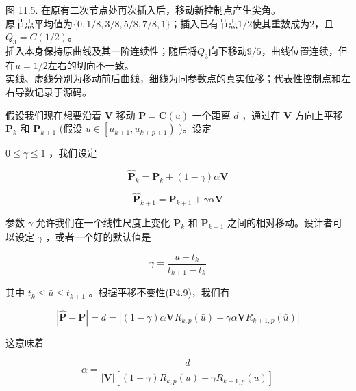 \documentclass[../main.tex]{subfiles}
\begin{document}
\begin{center}
\begin{minipage}{26cm}
\vspace*{.6\baselineskip}
\centering
{}
\par\smallskip
图 11.5. 在原有二次节点处再次插入后，移动新控制点产生尖角。\\
原节点平均值为$\{0,1/8,3/8,5/8,7/8,1\}$；插入已有节点$1/2$使其重数成为2，且$Q_3=C(1/2)$。\\
插入本身保持原曲线及其一阶连续性；随后将$Q_3$向下移动$9/5$，曲线位置连续，但在$u=1/2$左右的切向不一致。\\
实线、虚线分别为移动前后曲线，细线为同参数点的真实位移；代表性控制点和左右导数记录于源码。
\end{minipage}
\end{center}

假设我们现在想要沿着 \(\mathbf{V}\) 移动 \(\mathbf{P} = \mathbf{C}\left( \bar{u}\right)\) 一个距离 \(d\) ，通过在 \(\mathbf{V}\) 方向上平移 \({\mathbf{P}}_{k}\) 和 \({\mathbf{P}}_{k + 1}\) (假设 \(\bar{u} \in  \left\lbrack  {{u}_{k + 1},{u}_{k + p + 1}}\right)\) )。设定





\(0 \leq  \gamma  \leq  1\) ，我们设定

\[
{\widehat{\mathbf{P}}}_{k} = {\mathbf{P}}_{k} + \left( {1 - \gamma }\right) \alpha \mathbf{V}
\]

\[
{\widehat{\mathbf{P}}}_{k + 1} = {\mathbf{P}}_{k + 1} + {\gamma \alpha }\mathbf{V} \tag{11.7}
\]

参数 \(\gamma\) 允许我们在一个线性尺度上变化 \({\mathbf{P}}_{k}\) 和 \({\mathbf{P}}_{k + 1}\) 之间的相对移动。设计者可以设定 \(\gamma\) ，或者一个好的默认值是

\[
\gamma  = \frac{\bar{u} - {t}_{k}}{{t}_{k + 1} - {t}_{k}} \tag{11.8}
\]

其中 \({t}_{k} \leq  \bar{u} \leq  {t}_{k + 1}\) 。根据平移不变性(P4.9)，我们有

\[
\left| {\widehat{\mathbf{P}} - \mathbf{P}}\right|  = d = \left| {\left( {1 - \gamma }\right) \alpha \mathbf{V}{R}_{k,p}\left( \bar{u}\right)  + {\gamma \alpha }\mathbf{V}{R}_{k + 1,p}\left( \bar{u}\right) }\right|
\]

这意味着

\[
\alpha  = \frac{d}{\left| \mathbf{V}\right| \left\lbrack  {\left( {1 - \gamma }\right) {R}_{k,p}\left( \bar{u}\right)  + \gamma {R}_{k + 1,p}\left( \bar{u}\right) }\right\rbrack  } \tag{11.9}
\]
\end{document}
